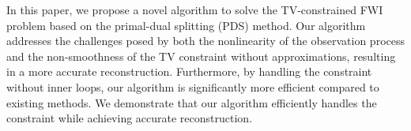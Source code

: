 In this paper, we propose a novel algorithm to solve the TV-constrained FWI problem based on the primal-dual splitting (PDS) method.
Our algorithm addresses the challenges posed by both the nonlinearity of the observation process and the non-smoothness of the TV constraint without approximations, resulting in a more accurate reconstruction.
Furthermore, by handling the constraint without inner loops, our algorithm is significantly more efficient compared to existing methods.
We demonstrate that our algorithm efficiently handles the constraint while achieving accurate reconstruction.
